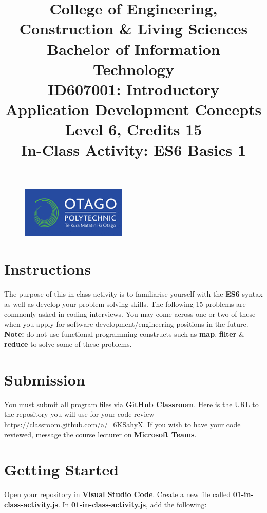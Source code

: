 \documentclass{article}
\author{}
\begin{document}
\begin{figure}
	\centering
	\includegraphics[width=50mm]{../img/logo.png}
\end{figure}

\title{College of Engineering, Construction \& Living Sciences\\Bachelor of Information Technology\\ID607001: Introductory Application Development Concepts\\Level 6, Credits 15\\\textbf{In-Class Activity: ES6 Basics 1}}
\date{}
\maketitle
 
\section*{Instructions}
The purpose of this in-class activity is to familiarise yourself with the \textbf{ES6} syntax as well as develop your problem-solving skills. The following 15 problems are commonly asked in coding interviews. You may come across one or two of these when you apply for software development/engineering positions in the future. \textbf{Note:} do not use functional programming constructs such as \textbf{map}, \textbf{filter} \& \textbf{reduce} to solve some of these problems.

\section*{Submission}
You must submit all program files via \textbf{GitHub Classroom}. Here is the URL to the repository you will use for your code review – \href{https://classroom.github.com/a/\_6KSahyX}{https://classroom.github.com/a/\_6KSahyX}. If you wish to have your code reviewed, message the course lecturer on \textbf{Microsoft Teams}.

\section*{Getting Started}
Open your repository in \textbf{Visual Studio Code}. Create a new file called \textbf{01-in-class-activity.js}. In \textbf{01-in-class-activity.js}, add the following:
\end{document}
